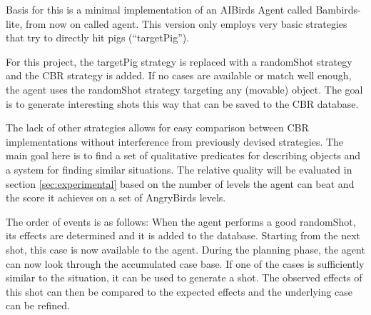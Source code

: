 Basis for this is a minimal implementation of an AIBirds Agent called Bambirds-lite, from now on called agent.
This version only employs very basic strategies that try to directly hit pigs (``targetPig'').

For this project, the targetPig strategy is replaced with a randomShot strategy and the CBR strategy is added.
If no cases are available or match well enough, the agent uses the randomShot strategy targeting any (movable) object. The goal is to generate interesting shots this way that can be saved to the \ac{CBR} database.

The lack of other strategies allows for easy comparison between CBR implementations without interference from previously devised strategies.
The main goal here is to find a set of qualitative predicates for describing objects and a system for finding similar situations.
The relative quality will be evaluated in section \ref{sec:experimental} based on the number of levels the agent can beat and the score it achieves on a set of AngryBirds levels.

The order of events is as follows:
When the agent performs a good randomShot, its effects are determined and it is added to the database. Starting from the next shot, this case is now available to the agent.
During the planning phase, the agent can now look through the accumulated case base.
If one of the cases is sufficiently similar to the situation, it can be used to generate a shot.
The observed effects of this shot can then be compared to the expected effects and the underlying case can be refined.
